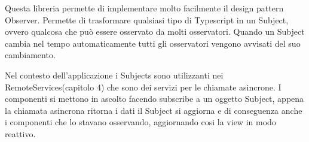 Questa libreria permette di implementare molto facilmente il design pattern Observer. Permette di trasformare qualsiasi tipo di Typescript in un Subject, ovvero qualcosa che può essere osservato da molti osservatori. Quando un Subject cambia nel tempo automaticamente tutti gli osservatori vengono avvisati del suo cambiamento. 

Nel contesto dell'applicazione i Subjects sono utilizzanti nei  RemoteServices(capitolo 4) che sono dei servizi per le chiamate asincrone. I componenti si mettono in ascolto facendo subscribe a un oggetto Subject, appena la chiamata asincrona ritorna i dati il Subject si aggiorna e di conseguenza anche i componenti che lo stavano osservando, aggiornando cosi la view in modo reattivo. 
